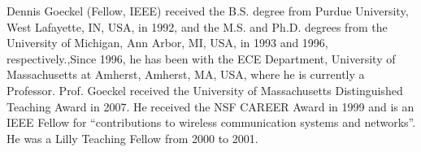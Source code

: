 \baselineskip
\begin{IEEEbiography}{Dennis Goeckel}
(Fellow, IEEE) received the B.S. degree from Purdue University, West Lafayette, IN, USA, in 1992, and the M.S. and Ph.D. degrees from the University of Michigan, Ann Arbor, MI, USA, in 1993 and 1996, respectively.,Since 1996, he has been with the ECE Department, University of Massachusetts at Amherst, Amherst, MA, USA, where he is currently a Professor. Prof. Goeckel received the University of Massachusetts Distinguished Teaching Award in 2007. He received the NSF CAREER Award in 1999 and is an IEEE Fellow for ``contributions to wireless communication systems and networks''. He was a Lilly Teaching Fellow from 2000 to 2001.
\end{IEEEbiography}






